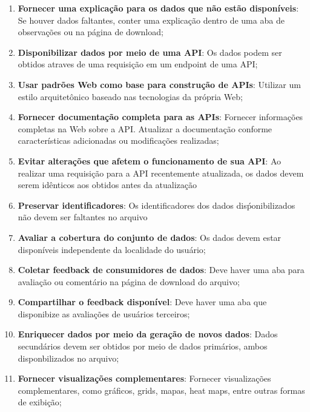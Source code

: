 \begin{enumerate}
    \item \textbf{Fornecer uma explicação para os dados que não estão disponíveis}: Se houver dados faltantes, conter uma explicação dentro de uma aba de observações ou na página de download;

    \item \textbf{Disponibilizar dados por meio de uma API}: Os dados podem ser obtidos atraves de uma requisição em um endpoint de uma API;

    \item \textbf{Usar padrões Web como base para construção de APIs}: Utilizar um estilo arquitetônico baseado nas tecnologias da própria Web;

    \item \textbf{Fornecer documentação completa para as APIs}: Fornecer informações completas na Web sobre a API. Atualizar a documentação conforme características adicionadas ou modificações realizadas;

    \item  \textbf{Evitar alterações que afetem o funcionamento de sua API}: Ao realizar uma requisição para a API recentemente atualizada, os dados devem serem idênticos aos obtidos antes da atualização

    \item \textbf{Preservar identificadores}: Os identificadores dos dados disṕonibilizados não devem ser faltantes no arquivo

    \item \textbf{Avaliar a cobertura do conjunto de dados}: Os dados devem estar disponíveis independente da localidade do usuário;

    \item \textbf{Coletar feedback de consumidores de dados}: Deve haver uma aba para avaliação ou comentário na página de download do arquivo;

    \item \textbf{Compartilhar o feedback disponível}: Deve haver uma aba que disponibize as avaliações de usuários terceiros;

    \item \textbf{Enriquecer dados por meio da geração de novos dados}: Dados secundários devem ser obtidos por meio de dados primários, ambos disponbilizados no arquivo;

    \item \textbf{Fornecer visualizações complementares}: Fornecer visualizações complementares, como gráficos, grids, mapas, heat maps, entre outras formas de exibição;


\end{enumerate}
